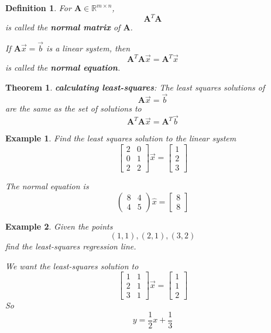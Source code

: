 \documentclass[11pt]{article}
\newtheorem{thm}{Theorem}
\newtheorem{defn}{Definition}
\newtheorem{ex}{Example}
\begin{document}
\begin{defn}
  For $\mathbf{A} \in \mathbb{R}^{m \times n}$,
  \[\mathbf{A}^{T}\mathbf{A}\]
  is called the \textbf{normal matrix} of $\mathbf{A}$.

  If $\mathbf{A}\vec{x} = \vec{b}$ is a linear system, then
  \[\mathbf{A}^{T}\mathbf{A} \vec{x} = \mathbf{A}^{T}\vec{x}\]
  is called the \textbf{normal equation}.
\end{defn}
\begin{thm}
  \textbf{calculating least-squares}: The least squares solutions of
  \[\mathbf{A}\vec{x} = \vec{b}\]
  are the same as the set of solutions to
  \[\mathbf{A}^{T}\mathbf{A} \vec{x} = \mathbf{A}^{T}\vec{b}\]
\end{thm}
\begin{ex}
  Find the least squares solution to the linear system
  \[\begin{bmatrix} 2 & 0 \\ 0 & 1 \\ 2 & 2 \end{bmatrix} \vec{x} = \begin{bmatrix} 1 \\ 2 \\ 3 \end{bmatrix}\]

  The normal equation is
  \[
\left(\begin{array}{rr}
8 & 4 \\
4 & 5
\end{array}\right)\hat{x} = \begin{bmatrix} 8 \\ 8 \end{bmatrix} \]
\end{ex}

\begin{ex}
  Given the points
  \[(1,1), (2,1), (3,2)\]
  find the least-squares regression line.

  We want the least-squares solution to
\[\begin{bmatrix} 1  & 1 \\ 2 & 1 \\ 3 & 1\end{bmatrix} \vec{x} = \begin{bmatrix} 1 \\ 1 \\ 2 \end{bmatrix}\]
So
\[y = \frac{1}{2}x + \frac{1}{3}\]
\end{ex}
\end{document}
